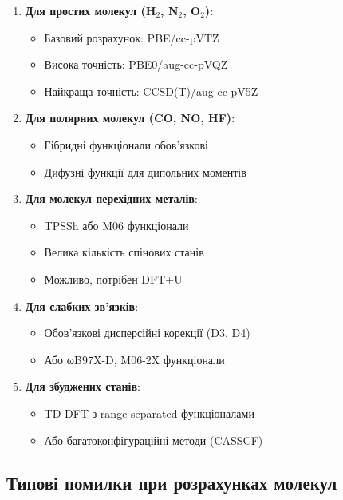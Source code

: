 \begin{enumerate}
    \item \textbf{Для простих молекул (H$_2$, N$_2$, O$_2$)}:
    \begin{itemize}
        \item Базовий розрахунок: PBE/cc-pVTZ
        \item Висока точність: PBE0/aug-cc-pVQZ
        \item Найкраща точність: CCSD(T)/aug-cc-pV5Z
    \end{itemize}

    \item \textbf{Для полярних молекул (CO, NO, HF)}:
    \begin{itemize}
        \item Гібридні функціонали обов'язкові
        \item Дифузні функції для дипольних моментів
    \end{itemize}

    \item \textbf{Для молекул перехідних металів}:
    \begin{itemize}
        \item TPSSh або M06 функціонали
        \item Велика кількість спінових станів
        \item Можливо, потрібен DFT+U
    \end{itemize}

    \item \textbf{Для слабких зв'язків}:
    \begin{itemize}
        \item Обов'язкові дисперсійні корекції (D3, D4)
        \item Або ωB97X-D, M06-2X функціонали
    \end{itemize}

    \item \textbf{Для збуджених станів}:
    \begin{itemize}
        \item TD-DFT з range-separated функціоналами
        \item Або багатоконфігураційні методи (CASSCF)
    \end{itemize}
\end{enumerate}

\subsection{Типові помилки при розрахунках молекул}


